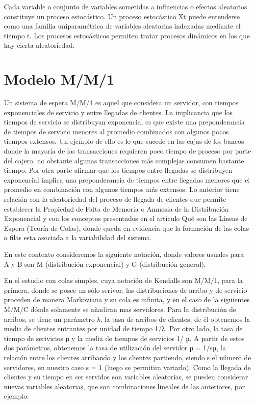 Cada variable o conjunto de variables sometidas a influencias o efectos aleatorios constituye un proceso estocástico.
Un proceso estocástico Xt puede entenderse como una familia uniparamétrica de
variables aleatorias indexadas mediante el tiempo t.
Los procesos estocásticos permiten tratar procesos dinámicos en los que hay cierta aleatoriedad.


\section{Modelo M/M/1}\label{sec:modelo-m/m/1}
Un sistema de espera M/M/1 es aquel que considera un servidor, con tiempos exponenciales de servicio y entre llegadas
de clientes. La implicancia que los tiempos de servicio se distribuyan exponencial es que existe una preponderancia de
tiempos de servicio menores al promedio combinados con algunos pocos tiempos extensos. Un ejemplo de ello es lo que
sucede en las cajas de los bancos donde la mayoría de las transacciones requieren poco tiempo de proceso por parte del
cajero, no obstante algunas transacciones más complejas consumen bastante tiempo. Por otra parte afirmar que los tiempos
entre llegadas se distribuyen exponencial implica una preponderancia de tiempos entre llegadas menores que el promedio
en combinación con algunos tiempos más extensos. Lo anterior tiene relación con la aleatoriedad del proceso de llegada
de clientes que permite establecer la Propiedad de Falta de Memoria o Amnesia de la Distribución Exponencial y
con los conceptos presentados en el artículo Qué son las Líneas de Espera (Teoría de Colas), donde queda en evidencia
que la formación de las colas o filas esta asociada a la variabilidad del sistema.

En este contexto consideremos la siguiente notación, donde valores usuales para A y B son M (distribución exponencial)
y G (distribución general).

En el estudio con colas simples, cuya notación de Kendalls son M/M/1, para la primera, donde se posee un sólo serivor,
las distribuciones de arribo y de servicio proceden de manera Markoviana y su cola es infinita, y en el caso de la
siguientes M/M/C dónde solamente se añadiran mas servidores.
Para la distribución de arribos, se tiene un parámetro λ, la tasa de arribos de clientes, de él obtenemos la media de
clientes entrantes por unidad de tiempo 1/λ.
Por otro lado, la tasa de tiempo de serivicios µ y la media de tiempos de servicios 1/ µ.
A partir de estos dos parámetros, obtenemos la tasa de utilización del servidor ρ = 1/sµ, la relación entre los clientes
arribando y los clientes partiendo, siendo s el número de servidores, en nuestro caso s = 1 (luego se permitira variarlo).
Como la llegada de clientes y su tiempo en ser servidos son variables aleatorias, se pueden considerar
nuevas variables aleatorias, que son combinaciones lineales de las anteriores, por ejemplo:

